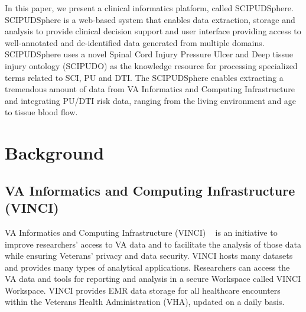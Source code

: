 \documentclass{amia}
\begin{document}
In this paper, we present a clinical informatics platform, called SCIPUDSphere. SCIPUDSphere is a web-based system that enables data extraction, storage and analysis to provide clinical decision support and user interface providing access to well-annotated and de-identified data generated from multiple domains. SCIPUDSphere uses a novel Spinal Cord Injury Pressure Ulcer and Deep tissue injury ontology (SCIPUDO) as the knowledge resource for processing specialized terms related to SCI, PU and DTI. The SCIPUDSphere enables extracting a tremendous amount of data from VA Informatics and Computing Infrastructure ~\cite{VINCI} and integrating PU/DTI risk data, ranging from the living environment and age to tissue blood flow. 

\section{Background}

\subsection{VA Informatics and Computing Infrastructure (VINCI)}
VA Informatics and Computing Infrastructure (VINCI) ~\cite{VINCI} is an initiative to improve researchers' access to VA data and to facilitate the analysis of those data while ensuring Veterans' privacy and data security. VINCI hosts many datasets and provides many types of analytical applications. Researchers can access the VA data and tools for reporting and analysis in a secure Workspace called VINCI Workspace. VINCI provides EMR data storage for all healthcare encounters within the Veterans Health Administration (VHA), updated on a daily basis. 

\end{document}
